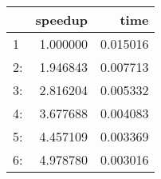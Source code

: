 \begin{tabular}{lrr}
\toprule
{} &   speedup &      time \\
\midrule
1  &  1.000000 &  0.015016 \\
2: &  1.946843 &  0.007713 \\
3: &  2.816204 &  0.005332 \\
4: &  3.677688 &  0.004083 \\
5: &  4.457109 &  0.003369 \\
6: &  4.978780 &  0.003016 \\
\bottomrule
\end{tabular}
